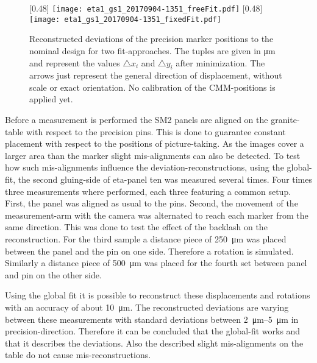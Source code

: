 \documentclass[
twoside,            %
BCOR1.4cm,          %
10pt,               %
headings=normal,    %
headsepline,        %
clearplainpage,		%
final,              %
div=14,
open=right,
bibliography=toc
]{scrreprt}
\begin{document}
\begin{figure}[!h]
	\centering
	[0.48\textwidth]
	{\texttt{[image: eta1\_gs1\_20170904-1351\_freeFit.pdf]}}
	\hfill
	[0.48\textwidth]
	{\texttt{[image: eta1\_gs1\_20170904-1351\_fixedFit.pdf]}}
	\vspace{-2mm}
	\caption{
		Reconstructed deviations of the precision marker positions to the nominal design for two fit-approaches.
		The tuples are given in \si{\micro\m} and represent the values $\bigtriangleup x_i$ and $\bigtriangleup y_i$ after minimization.
		The arrows just represent the general direction of displacement, without scale or exact orientation.
		No calibration of the CMM-positions is applied yet.
	}
	\label{eta1_gs1_20170904-1351}
\end{figure}

Before a measurement is performed the SM2 panels are aligned on the granite-table with respect to the precision pins. 
This is done to guarantee constant placement with respect to the positions of picture-taking.
As the images cover a larger area than the marker slight mis-alignments can also be detected.
To test how such mis-alignments influence the deviation-reconstructions, using the global-fit, the second gluing-side of eta-panel ten was measured several times.
Four times three measurements where performed, each three featuring a common setup.
First, the panel was aligned as usual to the pins.
Second, the movement of the measurement-arm with the camera was alternated to reach each marker from the same direction.
This was done to test the effect of the backlash on the reconstruction.
For the third sample a distance piece of \SI{250}{\micro\m} was placed between the panel and the pin on one side.
Therefore a rotation is simulated.
Similarly a distance piece of \SI{500}{\micro\m} was placed for the fourth set between panel and pin on the other side.

Using the global fit it is possible to reconstruct these displacements and rotations with an accuracy of about \SI{10}{\micro\m}.
The reconstructed deviations are varying between these measurements with standard deviations between \SIrange{2}{5}{\micro\m} in precision-direction.
Therefore it can be concluded that the global-fit works and that it describes the deviations.
Also the described slight mis-alignments on the table do not cause mis-reconstructions.
\end{document}
